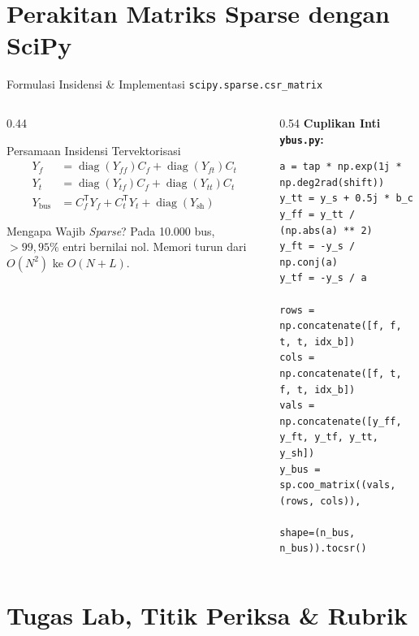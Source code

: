 \documentclass[aspectratio=169,10pt]{beamer}
\begin{document}
\section{Perakitan Matriks Sparse dengan SciPy}

\begin{frame}[fragile]{Formulasi Insidensi \& Implementasi \texttt{scipy.sparse.csr\_matrix}}
  \begin{columns}[T]
    \begin{column}{0.44\textwidth}
      \begin{block}{Persamaan Insidensi Tervektorisasi}
        \begin{align*}
          Y_f &= \operatorname{diag}(Y_{ff}) C_f + \operatorname{diag}(Y_{ft}) C_t \\
          Y_t &= \operatorname{diag}(Y_{tf}) C_f + \operatorname{diag}(Y_{tt}) C_t \\
          Y_{\text{bus}} &= C_f^{\mathsf{T}} Y_f + C_t^{\mathsf{T}} Y_t + \operatorname{diag}(Y_{\text{sh}})
        \end{align*}
      \end{block}
      \begin{exampleblock}{Mengapa Wajib \textit{Sparse}?}
        Pada 10.000 bus, $>99{,}95\%$ entri bernilai nol. Memori turun dari $O(N^2)$ ke $O(N+L)$.
      \end{exampleblock}
    \end{column}
    \begin{column}{0.54\textwidth}
      \textbf{Cuplikan Inti \texttt{ybus.py}:}
\begin{lstlisting}
a = tap * np.exp(1j * np.deg2rad(shift))
y_tt = y_s + 0.5j * b_c
y_ff = y_tt / (np.abs(a) ** 2)
y_ft = -y_s / np.conj(a)
y_tf = -y_s / a

rows = np.concatenate([f, f, t, t, idx_b])
cols = np.concatenate([f, t, f, t, idx_b])
vals = np.concatenate([y_ff, y_ft, y_tf, y_tt, y_sh])
y_bus = sp.coo_matrix((vals, (rows, cols)),
                      shape=(n_bus, n_bus)).tocsr()
\end{lstlisting}
    \end{column}
  \end{columns}
\end{frame}

\section{Tugas Lab, Titik Periksa \& Rubrik}
\end{document}
